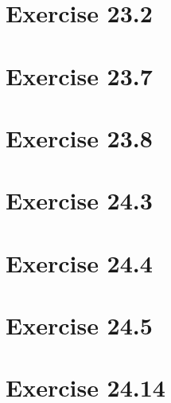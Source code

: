 \documentclass{article}
\begin{document}

\section*{Exercise 23.2}



\section*{Exercise 23.7}



\section*{Exercise 23.8}



\section*{Exercise 24.3}



\section*{Exercise 24.4}



\section*{Exercise 24.5}



\section*{Exercise 24.14}


\end{document}

